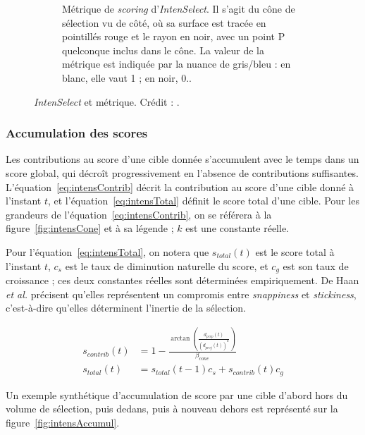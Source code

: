 \begin{figure}[!htb]
\begin{subfigure}[t]{0.49\textwidth}
			\caption{Métrique de \emph{scoring} d'\emph{IntenSelect}. Il s'agit du cône de sélection vu de côté, où sa surface est tracée en pointillés rouge et le rayon en noir, avec un point P quelconque inclus dans le cône. La valeur de la métrique est indiquée par la nuance de gris/bleu : en blanc, elle vaut 1 ; en noir, 0..}
			\label{fig:intensMetric}
		\end{subfigure}
		\caption[\emph{IntenSelect} et métrique]{\emph{IntenSelect} et métrique. Crédit : \cite{de2005intenselect}.}
		\label{fig:plop}
	\end{figure}
	
	\subsubsection{Accumulation des scores}
	Les contributions au score d'une cible donnée s'accumulent avec le temps dans un score global, qui décroît progressivement en l'absence de contributions suffisantes. L'équation~\ref{eq:intensContrib} décrit la contribution au score d'une cible donné à l'instant $t$, et l'équation~\ref{eq:intensTotal} définit le score total d'une cible. Pour les grandeurs de l'équation~\ref{eq:intensContrib}, on se référera à la figure~\ref{fig:intensCone} et à sa légende ; $k$ est une constante réelle.
	
	Pour l'équation~\ref{eq:intensTotal}, on notera que $s_{total}(t)$ est le score total à l'instant $t$, $c_{s}$ est le taux de diminution naturelle du score, et $c_{g}$ est son taux de croissance ; ces deux constantes réelles sont déterminées empiriquement. De Haan \emph{et al.} précisent qu'elles représentent un compromis entre \emph{snappiness} et \emph{stickiness}, c'est-à-dire qu'elles déterminent l'inertie de la sélection.
	
	\begin{align}
		\label{eq:intensContrib}
		s_{contrib}(t) &= 1 - \frac{\arctan \left(\frac{d_{perp}(t)}{\left(d_{proj}(t)\right)^{k}}\right)}{\beta_{cone}} \\
		\label{eq:intensTotal}
		s_{total}(t) &= s_{total}(t-1)c_{s} + s_{contrib}(t)c_{g}
	\end{align}
	
	Un exemple synthétique d'accumulation de score par une cible d'abord hors du volume de sélection, puis dedans, puis à nouveau dehors est représenté sur la figure~\ref{fig:intensAccumul}.
	
